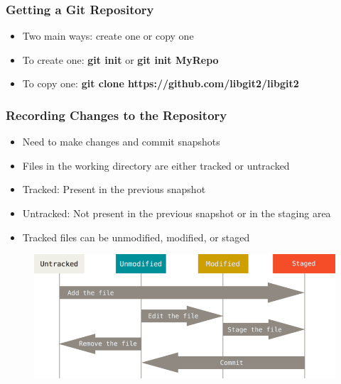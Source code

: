 \documentclass{beamer}
\begin{document}

\begin{frame}
	\frametitle{Getting a Git Repository}
	\begin{itemize}
		\item{Two main ways: create one or copy one}
		\item{To create one: \textbf{git init} or \textbf{git init MyRepo}}
		\item{To copy one: \textbf{git clone https://github.com/libgit2/libgit2}}
	\end{itemize}
\end{frame}

\begin{frame}
	\frametitle{Recording Changes to the Repository}
	\begin{itemize}
		\item{Need to make changes and commit snapshots}
		\item{Files in the working directory are either tracked or untracked}
		\item{Tracked: Present in the previous snapshot}
		\item{Untracked: Not present in the previous snapshot or in the staging area}
		\item{Tracked files can be unmodified, modified, or staged}
	\end{itemize}
	\begin{figure}
		\includegraphics[scale=0.37]{Recording_Changes_to_the_Repository-0.png}
	\end{figure}
\end{frame}
\end{document}
